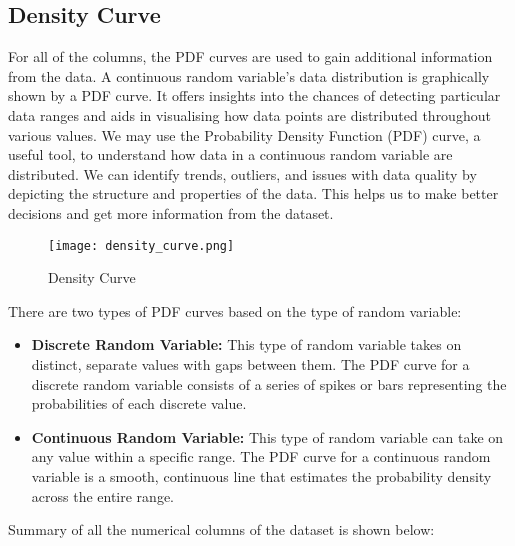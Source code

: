 \documentclass[12pt, a4paper,oneside]{book}
\numberwithin{equation}{section}
\begin{document}
\subsection{Density Curve}

For all of the columns, the PDF curves are used to gain additional information from the data. A continuous random variable's data distribution is graphically shown by a PDF curve. It offers insights into the chances of detecting particular data ranges and aids in visualising how data points are distributed throughout various values. We may use the Probability Density Function (PDF) curve, a useful tool, to understand how data in a continuous random variable are distributed. We can identify trends, outliers, and issues with data quality by depicting the structure and properties of the data. This helps us to make better decisions and get more information from the dataset.

 \begin{figure}[H]
\centerline{\texttt{[image: density\_curve.png]}}
\caption{Density Curve}
\label{fig:4.2}
\end{figure}

There are two types of PDF curves based on the type of random variable:

\begin{itemize}
 \item \textbf{Discrete Random Variable:} This type of random variable takes on distinct, separate values with gaps between them. The PDF curve for a discrete random variable consists of a series of spikes or bars representing the probabilities of each discrete value.
\end{itemize}

\begin{itemize}
    \item 

\textbf{Continuous Random Variable:} This type of random variable can take on any value within a specific range. The PDF curve for a continuous random variable is a smooth, continuous line that estimates the probability density across the entire range.
\end{itemize}



Summary of all the numerical columns of the dataset is shown below:
\end{document}
